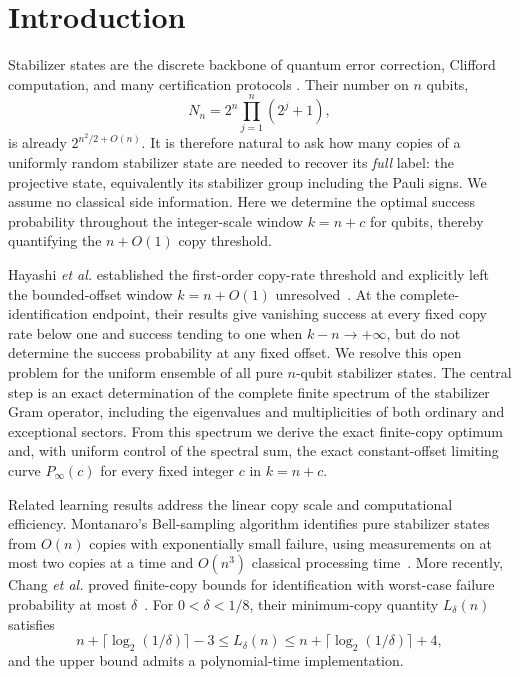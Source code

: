 \documentclass[journal,twocolumn]{IEEEtran}
\theoremstyle{definition}
\theoremstyle{plain}
\begin{document}
\section{Introduction}
\label{sec:introduction}
Stabilizer states are the discrete backbone of quantum error correction,
Clifford computation, and many certification protocols
\cite{AaronsonGottesman2004,Gross2006,GrossNezamiWalter2021}.  Their number on
$n$ qubits,
\begin{equation}
 N_n=2^n\prod_{j=1}^{n}(2^j+1),
 \label{eq:number}
\end{equation}
is already $2^{n^2/2+O(n)}$.  It is therefore natural to ask how many copies
of a uniformly random stabilizer state are needed to recover its \emph{full}
label: the projective state, equivalently its stabilizer group including the
Pauli signs.  We assume no classical side information.  Here we determine
the optimal success probability throughout the integer-scale window
$k=n+c$ for qubits, thereby quantifying the $n+O(1)$ copy threshold.

Hayashi \emph{et al.} established the first-order copy-rate threshold and
explicitly left the bounded-offset window $k=n+O(1)$
unresolved~\cite[Remark~10.6 and Sec.~13.3]{HayashiLu2026}.
At the complete-identification endpoint, their results give vanishing
success at every fixed copy rate below one and success tending to one
when $k-n\to+\infty$, but do not determine the success probability at
any fixed offset.  We resolve this open problem for the uniform ensemble
of all pure $n$-qubit stabilizer states.  The central step is an exact
determination of the complete finite spectrum of the stabilizer Gram
operator, including the eigenvalues and multiplicities of both ordinary
and exceptional sectors.  From this spectrum we derive the exact
finite-copy optimum and, with uniform control of the spectral sum, the
exact constant-offset limiting curve $P_\infty(c)$ for every fixed
integer $c$ in $k=n+c$.

Related learning results address the linear copy scale and
computational efficiency.  Montanaro's Bell-sampling algorithm identifies
pure stabilizer states from $O(n)$ copies with exponentially small failure,
using measurements on at most two copies at a time and $O(n^3)$ classical
processing time~\cite{Montanaro2017}.  More recently, Chang \emph{et al.}
proved finite-copy bounds for identification with worst-case failure
probability at most $\delta$~\cite{ChangCaroLaroccaWest2026}.  For
$0<\delta<1/8$, their minimum-copy quantity $L_\delta(n)$ satisfies
\begin{equation}
 n+\lceil\log_2(1/\delta)\rceil-3
 \leq L_\delta(n)
 \leq n+\lceil\log_2(1/\delta)\rceil+4,
 \label{eq:related-copy-bounds}
\end{equation}
and the upper bound admits a polynomial-time implementation.
\end{document}
